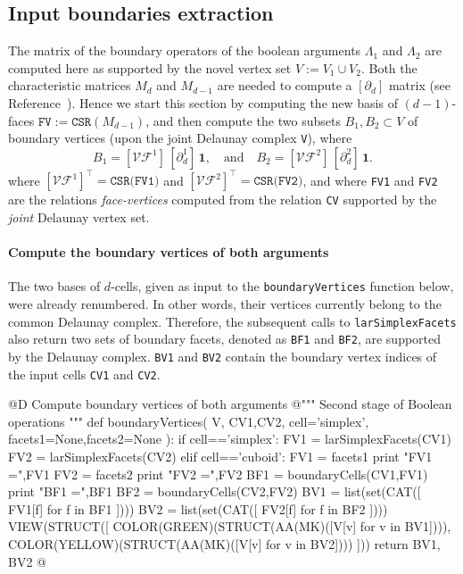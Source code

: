 \documentclass[11pt,oneside]{article}	%
\begin{document}
\subsection{Input boundaries extraction}

The matrix of the boundary operators of the boolean arguments $\Lambda_1$ and $\Lambda_2$ are computed here as supported by the novel vertex set $V := V_1 \cup V_2$. Both the characteristic matrices $M_d$ and $M_{d-1}$ are needed to compute a $[\partial_d]$ matrix (see Reference~\cite{Dicarlo:2014:TNL:2543138.2543294}). Hence we start this section by computing the new basis of $(d-1)$-faces $\texttt{FV} := \texttt{CSR}(M_{d-1})$, and then compute the two subsets $B_1,B_2 \subset V$ of boundary vertices (upon the joint Delaunay complex \texttt{V}), where
\[
B_1 = [\mathcal{VF}^1]\, [\partial_d^1]\,\mathbf{1},
\quad\mbox{and}\quad
B_2 = [\mathcal{VF}^2]\, [\partial_d^2]\,\mathbf{1}.
\]
where $[\mathcal{VF}^1]^\top = \texttt{CSR(FV1)}$ and $[\mathcal{VF}^2]^\top = \texttt{CSR(FV2)}$,
and where \texttt{FV1} and \texttt{FV2} are the relations \emph{face-vertices} computed from the relation \texttt{CV} supported by the \emph{joint} Delaunay vertex set. 

\paragraph{Compute the boundary vertices of both arguments}
The two bases of $d$-cells, given as input to the \texttt{boundaryVertices} function below, were already renumbered. In other words, their vertices currently belong to the common Delaunay complex. Therefore, the subsequent calls to \texttt{larSimplexFacets} also return two sets of boundary facets, denoted as \texttt{BF1} and \texttt{BF2}, are supported by the Delaunay complex. \texttt{BV1} and \texttt{BV2} contain the boundary vertex indices of the input cells \texttt{CV1} and \texttt{CV2}.

@D Compute boundary vertices of both arguments
@{""" Second stage of Boolean operations """
def boundaryVertices( V, CV1,CV2, cell='simplex', facets1=None,facets2=None ):
	if cell=='simplex': 
		FV1 = larSimplexFacets(CV1)
		FV2 = larSimplexFacets(CV2)
	elif cell=='cuboid': 
		FV1 = facets1
		print "\n FV1 =",FV1
		FV2 = facets2
		print "\n FV2 =",FV2
	BF1 = boundaryCells(CV1,FV1)
	print "\n BF1 =",BF1
	BF2 = boundaryCells(CV2,FV2)
	BV1 = list(set(CAT([ FV1[f] for f in BF1 ])))
	BV2 = list(set(CAT([ FV2[f] for f in BF2 ])))
	VIEW(STRUCT([ 
		COLOR(GREEN)(STRUCT(AA(MK)([V[v] for v in BV1]))), 
		COLOR(YELLOW)(STRUCT(AA(MK)([V[v] for v in BV2]))) ]))
	return BV1, BV2
@}
\end{document}

